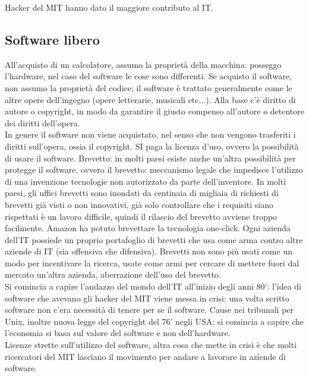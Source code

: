 \documentclass[12pt, oneside]{extbook}
\begin{document}
Hacker del MIT hanno dato il maggiore contributo al IT.
\subsection{Software libero}
All'acquisto di un calcolatore, assumo la proprietà della macchina: posseggo l'hardware, nel caso del software le cose sono differenti. Se acquisto il software, non assumo la proprietà del codice: il software è trattato generalmente come le altre opere dell'ingegno (opere letterarie, musicali etc...). Alla base c'è diritto di autore o copyright, in modo da garantire il giusto compenso all'autore o detentore dei diritti dell'opera.\\ In genere il software non viene acquistato, nel senso che non vengono trasferiti i diritti sull'opera, ossia il copyright. SI paga la licenza d'uso, ovvero la possibilità di usare il software. Brevetto: in molti paesi esiste anche un'altra possibilità per protegge il software, ovvero il brevetto: meccanismo legale che impedisce l'utilizzo di una invenzione tecnologie non autorizzato da parte dell'inventore. In molti paesi, gli uffici brevetti sono inondati da centinaia di migliaia di richiesti di brevetti già visti o non innovativi, già solo controllare che i requisiti siano rispettati è un lavoro difficile, quindi il rilascio del brevetto avviene troppo facilmente. Amazon ha potuto brevettare la tecnologia one-click. Ogni azienda dell'IT possiede un proprio portafoglio di brevetti che usa come arma contro altre aziende di IT (sia offensiva che difensiva). Brevetti non sono più usati come un modo per incentivare la ricerca, usate come armi per cercare di mettere fuori dal mercato un'altra azienda, aberrazione dell'uso del brevetto.\\ Si comincia a capire l'andazzo del mondo dell'IT all'inizio degli anni 80': l'idea di software che avevano gli hacker del MIT viene messa in crisi: una volta scritto software non c'era necessità di tenere per se il software. Cause nei tribunali per Unix, inoltre nuova legge del copyright del 76' negli USA: si comincia a capire che l'economia si basa sul valore del software e non dell'hardware.\\ Licenze strette sull'utilizzo del software, altra cosa che mette in crisi è che molti ricercatori del MIT lasciano il movimento per andare a lavorare in aziende di software.
\end{document}

